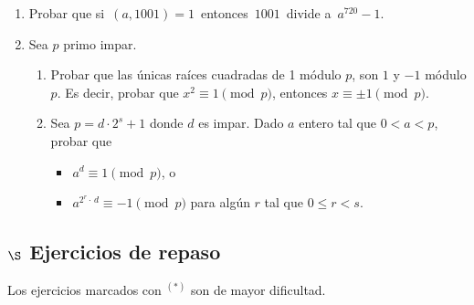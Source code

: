 \documentclass[a4paper,12pt,twoside,spanish,reqno]{amsbook}
\numberwithin{equation}{section}
\begin{document}
\begin{enumerate}
%

%
\item Probar que si \,$(a,1001)=1$\, entonces \,$1001$\, divide a \,$a^{720}-1$.

\item Sea $p$ primo impar. 
\begin{enumerate}
    \item Probar que las únicas raíces cuadradas de 1 módulo $p$,  son $1$ y $-1$ módulo $p$. Es decir, probar que $x^2 \equiv 1 \pmod{p}$, entonces  $x \equiv \pm1 \pmod{p}$.
    \item Sea  $p = d \cdot 2^s + 1$ donde $d$ es impar. Dado $a$ entero tal que $0 < a <p$, probar que 
    \begin{itemize}
        \item $a^{d} \equiv 1 \pmod{p}$, o
        \item $a^{2^r\cdot\, d} \equiv -1 \pmod{p}$  para algún $r$ tal que $0 \le r < s$.
    \end{itemize}
\end{enumerate}
\end{enumerate}



\subsection*{$\S$ Ejercicios de repaso} Los ejercicios marcados con ${}^{(*)}$ son de mayor dificultad.
\end{document}
